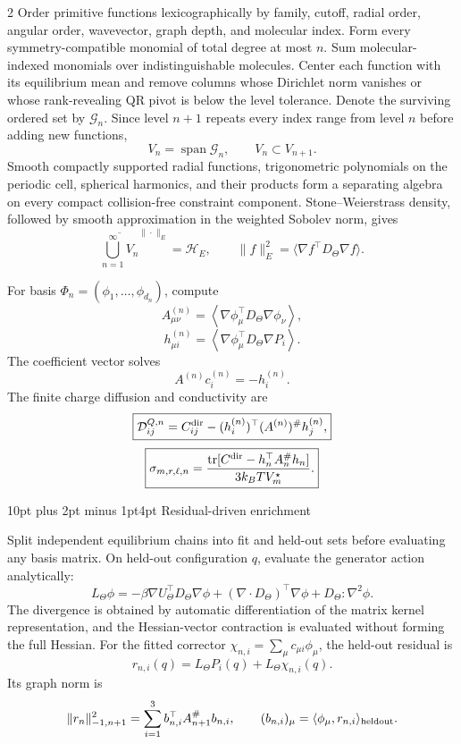\documentclass[10pt]{article}
\makeatletter
\renewcommand\section{\@startsection{section}{1}{0pt}%
  {10pt plus 2pt minus 1pt}{4pt}%
  {\large\sffamily\bfseries\color{lithioxfontgreen}}}
\newcommand{\tr}{\operatorname{tr}}
\newcommand{\pinv}{^{\#}}
\makeatother
\begin{document}
\begin{multicols}{2}
Order primitive functions lexicographically by family, cutoff, radial order,
angular order, wavevector, graph depth, and molecular index.  Form every
symmetry-compatible monomial of total degree at most \(n\).  Sum molecular-indexed
monomials over indistinguishable molecules.  Center each function with its
equilibrium mean and remove columns whose Dirichlet norm vanishes or whose
rank-revealing QR pivot is below the level tolerance.  Denote the surviving ordered
set by \(\mathcal G_n\).  Since level \(n+1\) repeats every index range from level
\(n\) before adding new functions,
\[
V_n=\operatorname{span}\mathcal G_n,\qquad V_n\subset V_{n+1}.
\]
Smooth compactly supported radial functions, trigonometric polynomials on the
periodic cell, spherical harmonics, and their products form a separating algebra
on every compact collision-free constraint component.  Stone--Weierstrass density,
followed by smooth approximation in the weighted Sobolev norm, gives
\[
\overline{\bigcup_{n=1}^\infty V_n}^{\|\cdot\|_E}=\mathcal H_E,\qquad
\|f\|_E^2=\langle\nabla f^\top D_\Theta\nabla f\rangle.
\]

For basis \(\Phi_n=(\phi_1,\ldots,\phi_{d_n})\), compute
\[
A_{\mu\nu}^{(n)}=
\left\langle\nabla\phi_\mu^\top D_\Theta\nabla\phi_\nu\right\rangle,
\]
\[
h_{\mu i}^{(n)}=
\left\langle\nabla\phi_\mu^\top D_\Theta\nabla P_i\right\rangle.
\]
The coefficient vector solves
\[
\boxed{A^{(n)}c_i^{(n)}=-h_i^{(n)}.}
\]
The finite charge diffusion and conductivity are
\[
\boxed{
\mathcal D^{Q,n}_{ij}=C^{\rm dir}_{ij}
-(h_i^{(n)})^\top(A^{(n)})\pinv h_j^{(n)},}
\]
\[
\boxed{
\sigma_{m,r,\ell,n}=
\frac{\tr[C^{\rm dir}-h_n^\top A_n\pinv h_n]}
{3k_BTV_m^\star}.}
\]

\section{Residual-driven enrichment}

Split independent equilibrium chains into fit and held-out sets before evaluating
any basis matrix.  On held-out configuration \(q\), evaluate the generator action
analytically:
\[
L_\Theta\phi=
-\beta\nabla U_\Theta^\top D_\Theta\nabla\phi
+(\nabla\cdot D_\Theta)^\top\nabla\phi
+D_\Theta:\nabla^2\phi .
\]
The divergence is obtained by automatic differentiation of the matrix kernel
representation, and the Hessian-vector contraction is evaluated without forming
the full Hessian.  For the fitted corrector
\(\chi_{n,i}=\sum_\mu c_{\mu i}\phi_\mu\), the held-out residual is
\[
r_{n,i}(q)=L_\Theta P_i(q)+L_\Theta\chi_{n,i}(q).
\]
Its graph norm is
\[
\|r_n\|_{-1,n+1}^2=
\sum_{i=1}^3
b_{n,i}^\top A_{n+1}\pinv b_{n,i},\qquad
(b_{n,i})_\mu=\langle\phi_\mu,r_{n,i}\rangle_{\rm heldout}.
\]


\end{multicols}
\end{document}
